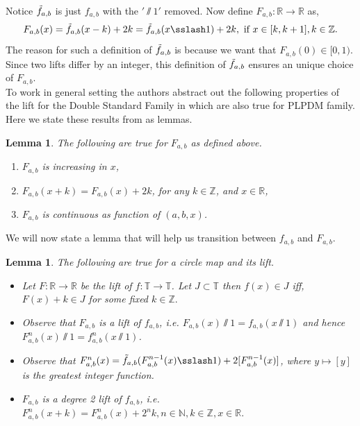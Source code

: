 \documentclass[12pt]{amsart}
\numberwithin{equation}{section}
\newtheorem{lemma}[theorem]{Lemma}
\theoremstyle{remark}
\begin{document}
Notice $\Tilde{f}_{a,b}$ is just $f_{a,b}$ with the $'\sslash 1'$ removed. Now define $F_{a,b}: \mathbb{R} \to \mathbb{R}$ as,
\[
F_{a,b}(x)=\Tilde{f}_{a,b}(x-k)+2k=\Tilde{f}_{a,b}(x\sslash 1)+2k, \text{ if } x \in [k,k+1], k \in \mathbb{Z}.
\]
The reason for such a definition of $\Tilde{f}_{a,b}$ is because we want that $F_{a,b}(0) \in [0,1)$. Since two lifts differ by an integer, this definition of $\Tilde{f}_{a,b}$ ensures an unique choice of  $F_{a,b}$.\\
\indent To work in general setting the authors  abstract out the following properties of the lift for the Double Standard Family in \cite{MR} which are also true for PLPDM family. Here we state these results from \cite{MR} as lemmas.
\vspace{.3cm}
\begin{lemma} The following are true for $F_{a,b}$ as defined above.
\begin{enumerate}
\item  $F_{a,b}$ is increasing in $x$,
\item  $F_{a,b}(x+k)=F_{a,b}(x)+2k$, for any $k \in \mathbb{Z}$, and $x\in \mathbb R$,
\item $F_{a,b}$ is continuous as function of $(a,b,x)$.
\end{enumerate}
  
\end{lemma}
We will now state a lemma that will help us transition between $f_{a,b}$ and $F_{a,b}$.
\begin{lemma} \label{lift}
The following are true for a circle map and its lift.
    \begin{itemize}
        \item   Let $F: \mathbb{R} \to \mathbb{R}$ be the lift of $f: \mathbb{T} \to \mathbb{T}$. Let $J \subset \mathbb{T}$ then $f(x)\in J$ iff, $F(x)+k \in J$ for some fixed $k \in \mathbb{Z}.$ 
        \item Observe that  $F_{a,b}$ is a lift of $f_{a,b}$, i.e.  $F_{a,b}(x)\sslash1=f_{a,b}(x\sslash1)$ and hence $F^n_{a,b}(x)\sslash1=f^n_{a,b}(x\sslash1)$. 
        \item Observe that $F_{a,b}^n(x)=\Tilde{f}_{a,b}(F_{a,b}^{n-1}(x)\sslash1)+2[F_{a,b}^{n-1}(x)]$, where $y \mapsto [y]$ is the greatest integer function. 
        \item $F_{a,b}$ is a degree 2 lift of $f_{a,b}$, i.e. $F_{a,b}^n(x+k)=F^n_{a,b}(x)+2^nk, n \in \mathbb{N}, k \in \mathbb{Z}, x \in \mathbb{R}.$
    \end{itemize}
  
\end{lemma}
\end{document}
